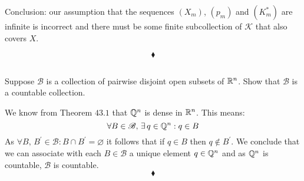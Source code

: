 Conclusion: our assumption that the sequences $(X_m)$, $(p_m)$ and $(K^{*}_m)$ are infinite is incorrect and there must be some finite subcollection of  $\mathscr{K}$ that also covers $X$.

$$\blacklozenge$$


\newpage
\subsection{}
\begin{tcolorbox}
Suppose $\mathscr{B}$ is a collection of pairwise disjoint open subsets of $\mathbb{R}^n$. Show that $\mathscr{B}$ is a countable collection.
\end{tcolorbox}
We know from Theorem $\mathbf{43.1}$ that $\mathbb{Q}^n$ is dense in $\mathbb{R}^n$.  This means:
$$\forall B\in\mathscr{B},\, \exists\, q\in \mathbb{Q}^n: q\in B$$
As $\forall B,\, B^{'}\in\mathscr{B}: B\cap B^{'}=\varnothing$ it follows that if $q\in B$ then $q\not \in B^{'}$. We conclude that we can associate with each $B\in\mathscr{B}$ a unique element $q\in\mathbb{Q}^n$ and as $\mathbb{Q}^n$ is countable, $\mathscr{B}$ is countable.
$$\blacklozenge$$\\

\newpage
{}

\renewcommand{\thesubsection}{\thesection.\RomanNumeralCaps{1}}

